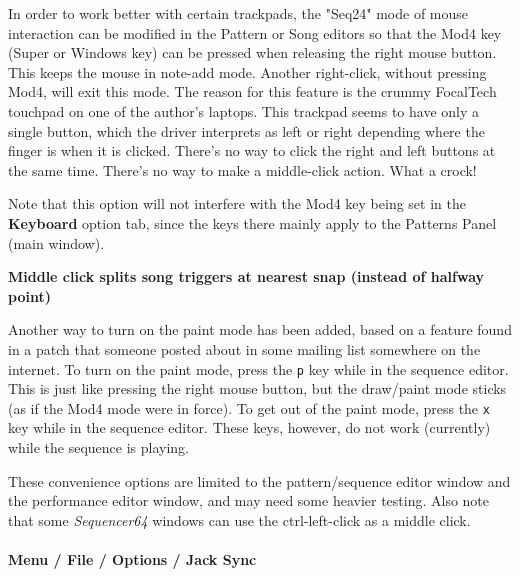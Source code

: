    In order to work better with certain trackpads, the
   "Seq24" mode of mouse interaction can be modified in the
   Pattern or Song editors so that the Mod4 key (Super or Windows key)
   can be pressed when releasing the right mouse button.
   This keeps the mouse in note-add mode.
   Another right-click, without pressing Mod4, will exit this mode.
   The reason for this feature is the crummy FocalTech touchpad on one of
   the author's laptops.  This trackpad seems to have only a single button,
   which the driver interprets as left or right depending where the finger
   is when it is clicked.  There's no way to click the right and left
   buttons at the same time.  There's no way to make a middle-click action.
   What a crock!

   Note that this option will not interfere with the Mod4 key being set
   in the \textbf{Keyboard} option tab, since the keys there mainly apply to
   the Patterns Panel (main window).

   \label{new_split_mode}
   \textbf{Middle click splits song triggers at nearest snap (instead of
   halfway point)}


   Another way to turn on the paint mode has been added, based on a feature
   found in a patch that someone posted about in some mailing list somewhere on
   the internet.
   To turn on the paint mode, press the
   \texttt{p} key while in the sequence editor.
   This is just like pressing the right mouse button, but the draw/paint mode
   sticks (as if the Mod4 mode were in force).
   To get out of the paint mode, press the
   \texttt{x} key while in the sequence editor.
   These keys, however, do not work (currently) while the sequence is playing.

   These convenience options are limited to the
   pattern/sequence editor window and the performance editor window, and may
   need some heavier testing.  Also note that some \textsl{Sequencer64} windows
   can use the ctrl-left-click as a middle click. 
 
\paragraph{Menu / File / Options / Jack Sync}
\label{paragraph:seq64_menu_file_options_jack_sync}

